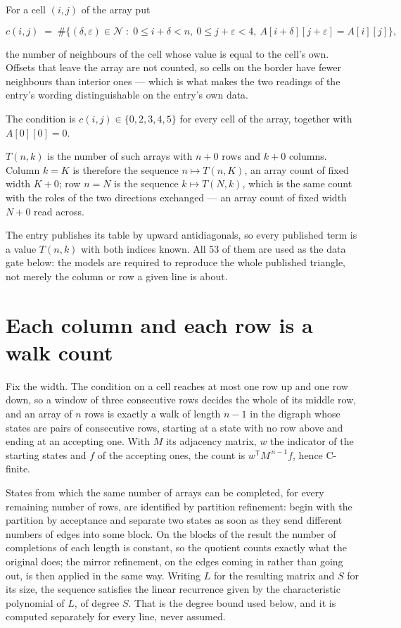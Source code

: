 \documentclass[11pt]{article}
\theoremstyle{definition}
\begin{document}
For a cell $(i,j)$ of the array put

\[c(i,j) \;=\; \#\bigl\{(\delta,\varepsilon)\in\mathcal{N} \;:\; 0\le i+\delta<n,\ 0\le j+\varepsilon<4,\ A[i+\delta][j+\varepsilon] = A[i][j]\bigr\},\]

the number of neighbours of the cell whose value is equal to the cell's own. Offsets that leave the array are not counted, so cells on the border have fewer neighbours than interior ones --- which is what makes the two readings of the entry's wording distinguishable on the entry's own data.

The condition is $c(i,j) \in \{0, 2, 3, 4, 5\}$ for every cell of the array, together with $A[0][0]=0$.

$T(n,k)$ is the number of such arrays with $n + 0$ rows and $k + 0$ columns. Column $k = K$ is therefore the sequence $n \mapsto T(n,K)$, an array count of fixed width $K + 0$; row $n = N$ is the sequence $k \mapsto T(N,k)$, which is the same count with the roles of the two directions exchanged --- an array count of fixed width $N + 0$ read across.

The entry publishes its table by upward antidiagonals, so every published term is a value $T(n,k)$ with both indices known. All 53 of them are used as the data gate below: the models are required to reproduce the whole published triangle, not merely the column or row a given line is about.

\section{Each column and each row is a walk count}

Fix the width. The condition on a cell reaches at most one row up and one row down, so a window of three consecutive rows decides the whole of its middle row, and an array of $n$ rows is exactly a walk of length $n-1$ in the digraph whose states are pairs of consecutive rows, starting at a state with no row above and ending at an accepting one. With $M$ its adjacency matrix, $w$ the indicator of the starting states and $f$ of the accepting ones, the count is $w^{\mathsf T}M^{\,n-1}f$, hence C-finite.

States from which the same number of arrays can be completed, for every remaining number of rows, are identified by partition refinement: begin with the partition by acceptance and separate two states as soon as they send different numbers of edges into some block. On the blocks of the result the number of completions of each length is constant, so the quotient counts exactly what the original does; the mirror refinement, on the edges coming in rather than going out, is then applied in the same way. Writing $L$ for the resulting matrix and $S$ for its size, the sequence satisfies the linear recurrence given by the characteristic polynomial of $L$, of degree $S$. That is the degree bound used below, and it is computed separately for every line, never assumed.
\end{document}
